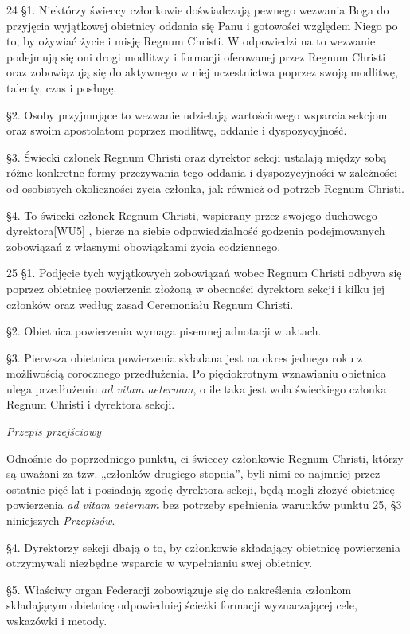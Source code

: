 ﻿\documentclass{report}
\newcommand{\lett}[1]{\lettrine[findent=6pt]{#1}{}}
\newcommand{\ssec}[1]{\vspace{1em}\textit{#1}\vspace{.5em}\nopagebreak}
\begin{document}
\lett{24} \S{}1. Niektórzy świeccy członkowie doświadczają pewnego wezwania Boga do przyjęcia wyjątkowej obietnicy oddania się Panu i gotowości względem Niego po to, by ożywiać życie i misję Regnum Christi. W odpowiedzi na to wezwanie podejmują się oni drogi modlitwy i formacji oferowanej przez Regnum Christi oraz zobowiązują się do aktywnego w niej uczestnictwa poprzez swoją modlitwę, talenty, czas i posługę.


\S{}2. Osoby przyjmujące to wezwanie udzielają wartościowego wsparcia sekcjom oraz swoim apostolatom poprzez modlitwę, oddanie i dyspozycyjność.


\S{}3. Świecki członek Regnum Christi oraz dyrektor sekcji ustalają między sobą różne konkretne formy przeżywania tego oddania i dyspozycyjności w zależności od osobistych okoliczności życia członka, jak również od potrzeb Regnum Christi.


\S{}4. To świecki członek Regnum Christi, wspierany przez swojego duchowego dyrektora[WU5] , bierze na siebie odpowiedzialność godzenia podejmowanych zobowiązań z własnymi obowiązkami życia codziennego.




\lett{25} \S{}1. Podjęcie tych wyjątkowych zobowiązań wobec Regnum Christi odbywa się poprzez obietnicę powierzenia złożoną w obecności dyrektora sekcji i kilku jej członków oraz według zasad Ceremoniału Regnum Christi.


\S{}2. Obietnica powierzenia wymaga pisemnej adnotacji w aktach.


\S{}3. Pierwsza obietnica powierzenia składana jest na okres jednego roku z możliwością corocznego przedłużenia. Po pięciokrotnym wznawianiu obietnica ulega przedłużeniu {\em ad vitam aeternam}, o ile taka jest wola świeckiego członka Regnum Christi i dyrektora sekcji.
 
\ssec{Przepis przejściowy}


Odnośnie do poprzedniego punktu, ci świeccy członkowie Regnum Christi, którzy są uważani za tzw. „członków drugiego stopnia”, byli nimi co najmniej przez ostatnie pięć lat i posiadają zgodę dyrektora sekcji, będą mogli złożyć obietnicę powierzenia {\em ad vitam aeternam} bez potrzeby spełnienia warunków punktu 25, \S{}3 niniejszych {\em Przepisów}.


\S{}4. Dyrektorzy sekcji dbają o to, by członkowie składający obietnicę powierzenia otrzymywali niezbędne wsparcie w wypełnianiu swej obietnicy.


\S{}5. Właściwy organ Federacji zobowiązuje się do nakreślenia członkom składającym obietnicę odpowiedniej ścieżki formacji wyznaczającej cele, wskazówki i metody.
 
\end{document}
